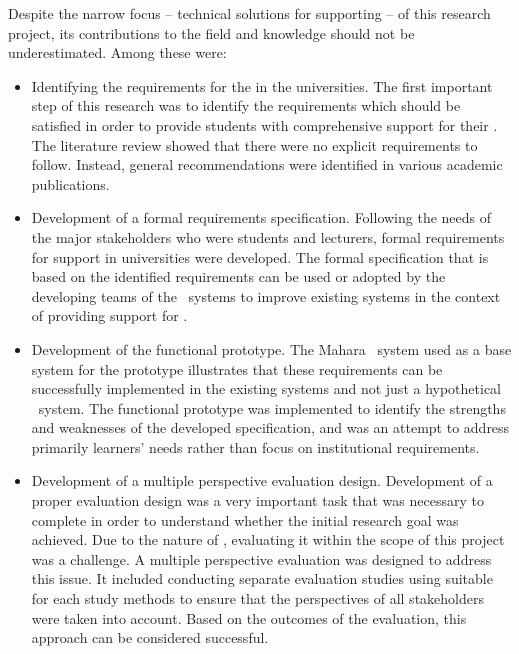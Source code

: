 Despite the narrow focus -- technical solutions for supporting \LLLs -- of this
research project, its contributions to the field and knowledge should not be
underestimated. Among these were:
\begin{itemize}
  \item Identifying the requirements for the \LLLs in the universities.
  The first important step of this research was to identify the requirements
  which should be satisfied in order to provide students with comprehensive
  support for their \LLLsn. The literature review showed that there were no
  explicit requirements to follow. Instead, general recommendations were
  identified in various academic publications. 
  
  \item Development of a formal requirements specification. Following the needs
  of the major stakeholders who were students and lecturers, formal requirements
  for \LLLs support in universities were developed. The formal specification
  that is based on the identified requirements can be used or adopted by the
  developing teams of the \ep~systems to improve existing systems in the context
  of providing support for \LLLsn.
  
  \item Development of the functional prototype. The Mahara \ep~system used as a
  base system for the prototype illustrates that these requirements can be
  successfully implemented in the existing systems and not just a hypothetical
  \ep~system. The functional prototype was implemented to identify the strengths
  and weaknesses of the developed specification, and was an attempt to address
  primarily learners' needs rather than focus on institutional requirements.
  
  \item Development of a multiple perspective evaluation design. Development of
  a proper evaluation design was a very important task that was necessary to
  complete in order to understand whether the initial research goal was
  achieved. Due to the nature of \LLLsn, evaluating it within the scope of this
  project was a challenge. A multiple perspective evaluation was designed to
  address this issue. It included conducting separate evaluation studies using
  suitable for each study methods to ensure that the perspectives of all
  stakeholders were taken into account. Based on the outcomes of the evaluation,
  this approach can be considered successful.
\end{itemize}

